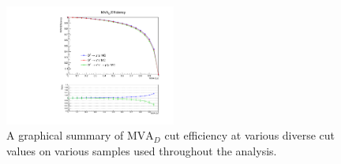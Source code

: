 \begin{figure}[htp]
    \begin{center}
      \includegraphics[width=0.5\textwidth]{figures/chapter4/mva/mva_efficiency.pdf}
    \end{center}
    \caption{
      A graphical summary of $\text{MVA}_D$ cut efficiency at various diverse cut values on various samples used throughout the analysis.
    }
    \label{fig:mva_cut_efficiencies}
\end{figure}

